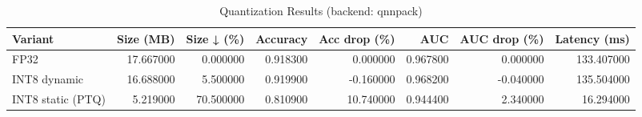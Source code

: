 \begin{table}
\caption{Quantization Results (backend: qnnpack)}
\label{tab:quant}
\begin{tabular}{lrrrrrrr}
\toprule
Variant & Size (MB) & Size ↓ (\%) & Accuracy & Acc drop (\%) & AUC & AUC drop (\%) & Latency (ms) \\
\midrule
FP32 & 17.667000 & 0.000000 & 0.918300 & 0.000000 & 0.967800 & 0.000000 & 133.407000 \\
INT8 dynamic & 16.688000 & 5.500000 & 0.919900 & -0.160000 & 0.968200 & -0.040000 & 135.504000 \\
INT8 static (PTQ) & 5.219000 & 70.500000 & 0.810900 & 10.740000 & 0.944400 & 2.340000 & 16.294000 \\
\bottomrule
\end{tabular}
\end{table}

